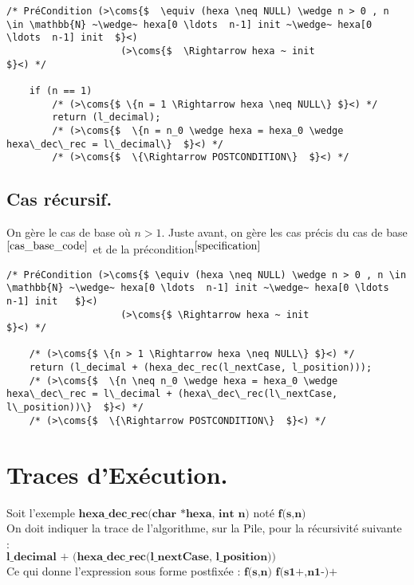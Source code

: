 \documentclass[a4paper, 11pt, oneside]{article}
\newcommand{\coms}[1]{\textcolor{MidnightBlue}{#1}}
\begin{document}
		\begin{lstlisting}[caption={Cas de base}]
	/* PréCondition (>\coms{$  \equiv (hexa \neq NULL) \wedge n > 0 , n \in \mathbb{N} ~\wedge~ hexa[0 \ldots  n-1] init ~\wedge~ hexa[0 \ldots  n-1] init  $}<)
	 				(>\coms{$  \Rightarrow hexa ~ init																										$}<) */

	if (n == 1)
		/* (>\coms{$ \{n = 1 \Rightarrow hexa \neq NULL\} $}<) */
		return (l_decimal);
		/* (>\coms{$  \{n = n_0 \wedge hexa = hexa_0 \wedge hexa\_dec\_rec = l\_decimal\}  $}<) */
		/* (>\coms{$  \{\Rightarrow POSTCONDITION\}  $}<) */

		\end{lstlisting}
				
	\subsection{Cas récursif.}
	
		On gère le cas de base où $n > 1$. Juste avant, on gère les cas précis du cas de base $^{\ref{cas_base_code}}$ et de la précondition$^{\ref{specification}}$

		\begin{lstlisting}[caption={Cas récursif}]
	/* PréCondition (>\coms{$ \equiv (hexa \neq NULL) \wedge n > 0 , n \in \mathbb{N} ~\wedge~ hexa[0 \ldots  n-1] init ~\wedge~ hexa[0 \ldots  n-1] init 	$}<)
	 	  		    (>\coms{$ \Rightarrow hexa ~ init 																										$}<) */

	/* (>\coms{$ \{n > 1 \Rightarrow hexa \neq NULL\} $}<) */
	return (l_decimal + (hexa_dec_rec(l_nextCase, l_position)));
	/* (>\coms{$  \{n \neq n_0 \wedge hexa = hexa_0 \wedge hexa\_dec\_rec = l\_decimal + (hexa\_dec\_rec(l\_nextCase, l\_position))\}  $}<) */
	/* (>\coms{$  \{\Rightarrow POSTCONDITION\}  $}<) */

		\end{lstlisting}

\section{Traces d'Exécution.}\label{traces}

	Soit l'exemple $\textbf{hexa\_dec\_rec(char *hexa, int n)}$ noté $\textbf{f(s,n)}$ 
	\\ On doit indiquer la trace de l’algorithme, sur la Pile, pour la récursivité suivante :  
	\\ $\textbf{l\_decimal + (hexa\_dec\_rec(l\_nextCase, l\_position))}$
	\\ Ce qui donne l'expression sous forme postfixée : $\textbf{f(s,n) f(s1+,n1-)+}$
	\\
\end{document}
